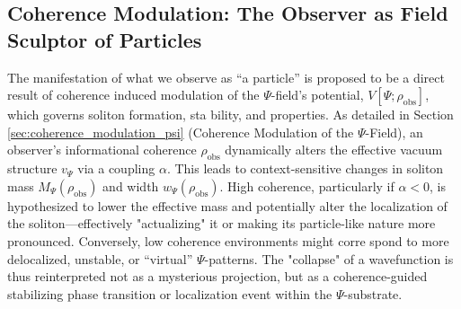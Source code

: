 \documentclass{report}
\begin{document}
    \subsection{Coherence Modulation: The Observer as Field Sculptor of Particles}
    \label{subsec:coherence_observer_sculptor}
    The manifestation of what we observe as “a particle” is proposed to be a direct result of coherence induced modulation of the $\Psi$-field’s potential, $V[\Psi; \rho_{\text{obs}}]$, which governs soliton formation, sta bility, and properties. As detailed in Section \ref{sec:coherence_modulation_psi} (Coherence Modulation of the $\Psi$-Field), an
    observer’s informational coherence $\rho_{\text{obs}}$ dynamically alters the effective vacuum structure $v_{\Psi}$
    via a coupling $\alpha$. This leads to context-sensitive changes in soliton mass $M_{\Psi}(\rho_{\text{obs}})$ and width $w_{\Psi}(\rho_{\text{obs}})$. High coherence, particularly if $\alpha < 0$, is hypothesized to lower the effective mass
    and potentially alter the localization of the soliton—effectively "actualizing" it or making its
    particle-like nature more pronounced. Conversely, low coherence environments might corre spond to more delocalized, unstable, or “virtual” $\Psi$-patterns. The "collapse" of a wavefunction is
    thus reinterpreted not as a mysterious projection, but as a coherence-guided stabilizing phase
    transition or localization event within the $\Psi$-substrate.
\end{document}
